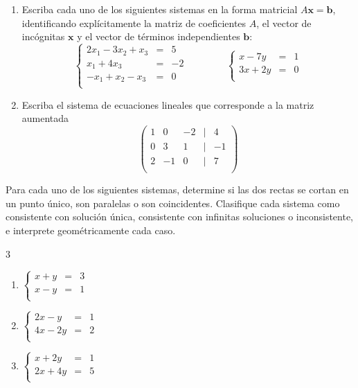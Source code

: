 \begin{prob}
\begin{enumerate}[$a)$]
\item Escriba cada uno de los siguientes sistemas en la forma matricial $A\mathbf{x}=\mathbf{b}$, identificando explícitamente la matriz de coeficientes $A$, el vector de incógnitas $\mathbf{x}$ y el vector de términos independientes $\mathbf{b}$:
\[
\left\lbrace \begin{array}{ccc}
2x_1-3x_2+x_3&=&5\\
x_1+4x_3&=&-2\\
-x_1+x_2-x_3&=&0\\
\end{array} \right. \qquad\qquad
\left\lbrace \begin{array}{ccc}
x-7y&=&1\\
3x+2y&=&0\\
\end{array} \right.
\]
\item Escriba el sistema de ecuaciones lineales que corresponde a la matriz aumentada
\[
\left( \begin{array}{ccccc}
1&0&-2&|&4\\
0&3&1&|&-1\\
2&-1&0&|&7\\
\end{array} \right)
\]
\end{enumerate}
\end{prob}

\begin{prob} Para cada uno de los siguientes sistemas, determine si las dos rectas se cortan en un punto único, son paralelas o son coincidentes. Clasifique cada sistema como consistente con solución única, consistente con infinitas soluciones o inconsistente, e interprete geométricamente cada caso.
\begin{multicols}{3}
\begin{enumerate}[$a)$]
\item $\left\lbrace \begin{array}{ccc}
x+y&=&3\\
x-y&=&1\\
\end{array} \right. $

\item $\left\lbrace \begin{array}{ccc}
2x-y&=&1\\
4x-2y&=&2\\
\end{array} \right. $

\item $\left\lbrace \begin{array}{ccc}
x+2y&=&1\\
2x+4y&=&5\\
\end{array} \right. $
\end{enumerate}
\end{multicols}
\end{prob}

